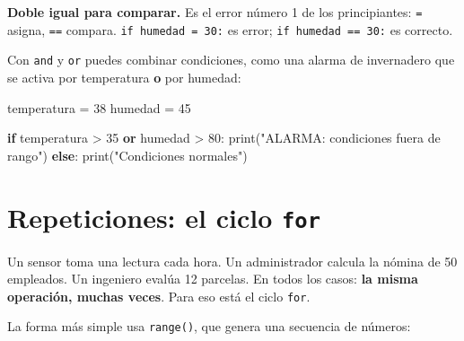 \documentclass[
  spanish,
  letterpaper,
  DIV=11,
  numbers=noendperiod]{scrreprt}
\newenvironment{Shaded}{\begin{snugshade}}{\end{snugshade}}
\newcommand{\BuiltInTok}[1]{\textcolor[rgb]{0.00,0.23,0.31}{#1}}
\newcommand{\ControlFlowTok}[1]{\textcolor[rgb]{0.00,0.23,0.31}{\textbf{#1}}}
\newcommand{\DecValTok}[1]{\textcolor[rgb]{0.68,0.00,0.00}{#1}}
\newcommand{\KeywordTok}[1]{\textcolor[rgb]{0.00,0.23,0.31}{\textbf{#1}}}
\newcommand{\NormalTok}[1]{\textcolor[rgb]{0.00,0.23,0.31}{#1}}
\newcommand{\OperatorTok}[1]{\textcolor[rgb]{0.37,0.37,0.37}{#1}}
\newcommand{\StringTok}[1]{\textcolor[rgb]{0.13,0.47,0.30}{#1}}
\begin{document}
\begin{tcolorbox}[enhanced jigsaw, arc=.35mm, bottomrule=.15mm, bottomtitle=1mm, breakable, colback=white, colbacktitle=quarto-callout-important-color!10!white, colframe=quarto-callout-important-color-frame, coltitle=black, left=2mm, leftrule=.75mm, opacityback=0, opacitybacktitle=0.6, rightrule=.15mm, title=\textcolor{quarto-callout-important-color}{\faExclamation}\hspace{0.5em}{Importante}, titlerule=0mm, toprule=.15mm, toptitle=1mm]

\textbf{Doble igual para comparar.} Es el error número 1 de los
principiantes: \texttt{=} asigna, \texttt{==} compara.
\texttt{if\ humedad\ =\ 30:} es error; \texttt{if\ humedad\ ==\ 30:} es
correcto.

\end{tcolorbox}

Con \texttt{and} y \texttt{or} puedes combinar condiciones, como una
alarma de invernadero que se activa por temperatura \textbf{o} por
humedad:

\begin{Shaded}
\begin{Highlighting}[]
\NormalTok{temperatura }\OperatorTok{=} \DecValTok{38}
\NormalTok{humedad }\OperatorTok{=} \DecValTok{45}

\ControlFlowTok{if}\NormalTok{ temperatura }\OperatorTok{\textgreater{}} \DecValTok{35} \KeywordTok{or}\NormalTok{ humedad }\OperatorTok{\textgreater{}} \DecValTok{80}\NormalTok{:}
    \BuiltInTok{print}\NormalTok{(}\StringTok{"ALARMA: condiciones fuera de rango"}\NormalTok{)}
\ControlFlowTok{else}\NormalTok{:}
    \BuiltInTok{print}\NormalTok{(}\StringTok{"Condiciones normales"}\NormalTok{)}
\end{Highlighting}
\end{Shaded}

\section{\texorpdfstring{Repeticiones: el ciclo
\texttt{for}}{Repeticiones: el ciclo for}}\label{repeticiones-el-ciclo-for}

Un sensor toma una lectura cada hora. Un administrador calcula la nómina
de 50 empleados. Un ingeniero evalúa 12 parcelas. En todos los casos:
\textbf{la misma operación, muchas veces}. Para eso está el ciclo
\texttt{for}.

La forma más simple usa \texttt{range()}, que genera una secuencia de
números:
\end{document}
